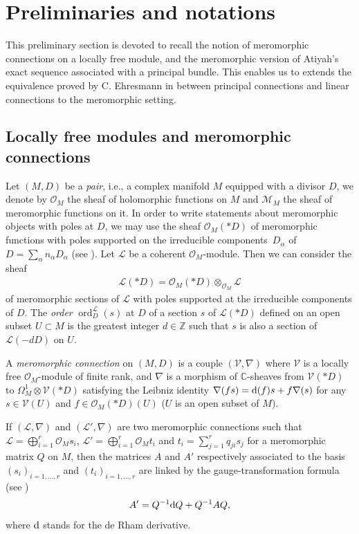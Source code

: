 \documentclass[pdftex]{sigma}
\numberwithin{equation}{section}
\begin{document}
 \section{Preliminaries and notations}\label{section1}
This preliminary section is devoted to recall the notion of meromorphic connections on a locally free module, and the meromorphic version of Atiyah's exact sequence associated with a principal bundle. This enables us to extends the equivalence proved by C. Ehresmann in \cite{Erhesmanh} between principal connections and linear connections to the meromorphic setting.

\subsection{Locally free modules and meromorphic connections}
Let $(M,D)$ be a \textit{pair}, i.e., a complex manifold $M$ equipped with a divisor $D$, we denote by $\mathcal{O}_M$ the sheaf of holomorphic functions on $M$ and $\mathcal{M}_M$ the sheaf of meromorphic functions on it. In order to write statements about meromorphic objects with poles at $D$, we may use the sheaf $\mathcal{O}_M(* D)$ of meromorphic functions with poles supported on the irreducible components~$D_\alpha$ of~$D=\sum_{\alpha} n_\alpha D_\alpha$ (see \cite[p.~17]{Sabbah}). Let $\mathcal{L}$ be a coherent $\mathcal{O}_M$-module. Then we can consider the sheaf
 \begin{gather*}%
 \mathcal{L}(* D) = \mathcal{O}_M(* D)\otimes_{\mathcal{O}_M} \mathcal{L} \end{gather*}
 of meromorphic sections of $\mathcal{L}$ with poles supported at the irreducible components of $D$. The \textit{order} $\operatorname{ord}^\mathcal{L}_D(s)$ at $D$ of a section $s$ of $\mathcal{L}(* D)$ defined on an open subset $U\subset M$ is the greatest integer $d\in \mathbb{Z}$ such that $s$ is also a section of $\mathcal{L}(-d D)$ on $U$.
\begin{Definition}\label{connection} A \textit{meromorphic connection} on $(M,D)$ is a couple $(\mathcal{V},\nabla)$ where $\mathcal{V}$ is a locally free $\mathcal{O}_M$-module of finite rank, and $\nabla$ is a morphism of $\mathbb{C}$-sheaves from $\mathcal{V}(* D)$ to $\Omega^1_M \otimes \mathcal{V}(* D)$ satisfying the Leibniz identity $\nabla(fs) = {\rm d}(f) s + f\nabla(s)$ for any $s\in \mathcal{V}(U)$ and $f\in \mathcal{O}_M(* D)(U)$ ($U$ is an open subset of $M$).
\end{Definition}
If $(\mathcal{L},\nabla)$ and $(\mathcal{L}',\nabla)$ are two meromorphic connections such that $\mathcal{L}= \bigoplus_{i=1}^{r} \mathcal{O}_M s_i$, $\mathcal{L}'= \bigoplus_{i=1}^{r} \mathcal{O}_M t_i$ and $t_i = \sum_{j=1}^{r} q_{ji} s_j$ for a meromorphic matrix $Q$ on $M$, then the matrices $A$ and $A'$ respectively associated to the basis $(s_i)_{i=1,\dots,r}$ and $(t_i)_{i=1,\dots,r}$ are linked by the gauge-transformation formula (see \cite[p.~29]{Sabbah})
\begin{gather*}%
 A' = Q^{-1}{\rm d}Q + Q^{-1}AQ,
\end{gather*}
where ${\rm d}$ stands for the de Rham derivative.
\end{document}
